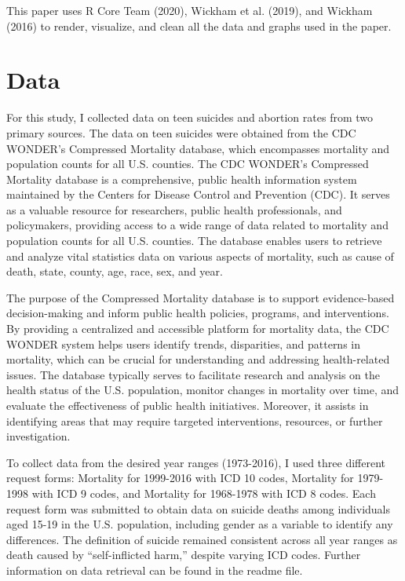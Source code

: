 \documentclass[
  letterpaper,
  DIV=11,
  numbers=noendperiod]{scrartcl}
\begin{document}
This paper uses R Core Team (2020), Wickham et al. (2019), and Wickham
(2016) to render, visualize, and clean all the data and graphs used in
the paper.

\hypertarget{sec-data}{%
\section{Data}\label{sec-data}}

For this study, I collected data on teen suicides and abortion rates
from two primary sources. The data on teen suicides were obtained from
the CDC WONDER's Compressed Mortality database, which encompasses
mortality and population counts for all U.S. counties. The CDC WONDER's
Compressed Mortality database is a comprehensive, public health
information system maintained by the Centers for Disease Control and
Prevention (CDC). It serves as a valuable resource for researchers,
public health professionals, and policymakers, providing access to a
wide range of data related to mortality and population counts for all
U.S. counties. The database enables users to retrieve and analyze vital
statistics data on various aspects of mortality, such as cause of death,
state, county, age, race, sex, and year.

The purpose of the Compressed Mortality database is to support
evidence-based decision-making and inform public health policies,
programs, and interventions. By providing a centralized and accessible
platform for mortality data, the CDC WONDER system helps users identify
trends, disparities, and patterns in mortality, which can be crucial for
understanding and addressing health-related issues. The database
typically serves to facilitate research and analysis on the health
status of the U.S. population, monitor changes in mortality over time,
and evaluate the effectiveness of public health initiatives. Moreover,
it assists in identifying areas that may require targeted interventions,
resources, or further investigation.

To collect data from the desired year ranges (1973-2016), I used three
different request forms: Mortality for 1999-2016 with ICD 10 codes,
Mortality for 1979-1998 with ICD 9 codes, and Mortality for 1968-1978
with ICD 8 codes. Each request form was submitted to obtain data on
suicide deaths among individuals aged 15-19 in the U.S. population,
including gender as a variable to identify any differences. The
definition of suicide remained consistent across all year ranges as
death caused by ``self-inflicted harm,'' despite varying ICD codes.
Further information on data retrieval can be found in the readme file.
\end{document}
